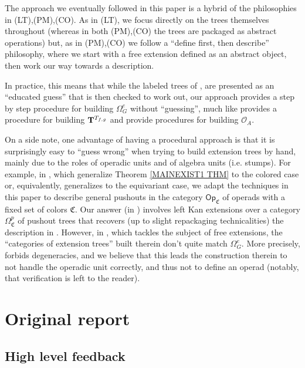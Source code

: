 \documentclass{article}
\begin{document}
The approach we eventually followed in this paper is 
a hybrid of the philosophies in (LT),(PM),(CO).
As in (LT), we focus directly on the trees themselves throughout
(whereas in both (PM),(CO)
the trees are packaged as abstract operations)
but, as in (PM),(CO)
we follow a ``define first, then describe'' philosophy,
where we start with a free extension defined as an 
abstract object,
then work our way towards a description.

In practice, this means that while the labeled trees of 
\cite{BM03},\cite{Cav} are presented as an ``educated guess'' that is then checked to work out,
our approach provides a step by step procedure for 
building $\Omega^e_G$
without ``guessing'', 
much like \cite{BB17} provides a procedure for building
$\bold{T}^{T_{f,g}}$
and \cite{WY18,Ha10,Pe16}
provide procedures for building $\mathcal{O}_A$.

On a side note,
one advantage of having a procedural approach is that it is surprisingly easy to ``guess wrong''
when trying to build extension trees by hand,
mainly due to the roles of operadic units and of algebra units (i.e. stumps).
For example, 
in \cite{BP_HGOP},
which generalize Theorem \ref{MAINEXIST1 THM} to the colored case 
or, equivalently, generalizes 
\cite{Cav} to the equivariant case,
we adapt the techniques in this paper to describe general pushouts
in the category $\mathsf{Op}_{\mathfrak{C}}$ of operads with a fixed set of colors $\mathfrak C$.
Our answer (in \cite[App. A.5]{BP_HGOP}) involves left Kan extensions over a category
$\Omega^p_{\mathfrak{C}}$ of pushout trees 
that recovers (up to slight repackaging technicalities)
the description in 
\cite[App. B]{Cav}.
However, in \cite[App. C]{Cav}, 
which tackles the subject of free extensions, 
the ``categories of extension trees'' built therein
don't quite match $\Omega^e_G$.
More precisely, \cite[App. C]{Cav} forbids degeneracies,
and we believe that this leads the construction therein to
not handle the operadic unit correctly,
and thus not to define an operad (notably, that verification is left to the reader).


\fi



\newpage


\section{Original report}



\subsection*{High level feedback}
\end{document}
